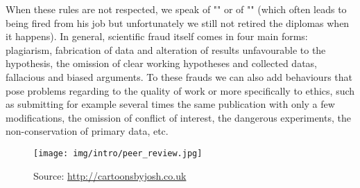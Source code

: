 	When these rules are not respected, we speak of "" or of "" (which often leads to being fired from his job but unfortunately we still not retired the diplomas when it happens). In general, scientific fraud itself comes in four main forms: plagiarism, fabrication of data and alteration of results unfavourable to the hypothesis, the omission of clear working hypotheses and collected datas, fallacious and biased arguments. To these frauds we can also add behaviours that pose problems regarding to the quality of work or more specifically to ethics, such as  submitting for example several times the same publication with only a few modifications, the omission of conflict of interest, the dangerous experiments, the non-conservation of primary data, etc.
	\begin{figure}[H]
		\centering
		\texttt{[image: img/intro/peer\_review.jpg]}
		\caption[]{Source: \url{http://cartoonsbyjosh.co.uk}}
	\end{figure}	

